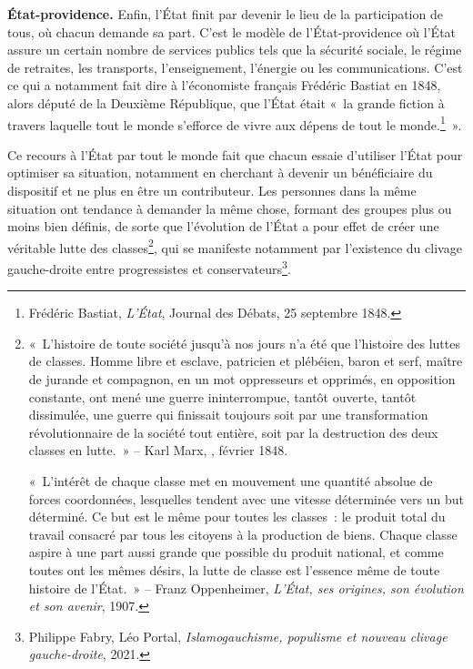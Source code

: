 \textbf{État-providence.} Enfin, l'État finit par devenir le lieu de la participation de tous, où chacun demande sa part. C'est le modèle de l'État-providence où l'État assure un certain nombre de services publics tels que la sécurité sociale, le régime de retraites, les transports, l'enseignement, l'énergie ou les communications. C'est ce qui a notamment fait dire à l'économiste français Frédéric Bastiat en 1848, alors député de la Deuxième République, que l'État était «~la grande fiction à travers laquelle tout le monde s'efforce de vivre aux dépens de tout le monde.\footnote{Frédéric Bastiat, \emph{L'État}, Journal des Débats, 25 septembre 1848.}~». %

Ce recours à l'État par tout le monde fait que chacun essaie d'utiliser l'État pour optimiser sa situation, notamment en cherchant à devenir un bénéficiaire du dispositif et ne plus en être un contributeur. Les personnes dans la même situation ont tendance à demander la même chose, formant des groupes plus ou moins bien définis, de sorte que l'évolution de l'État a pour effet de créer une véritable lutte des classes\footnote{«~L'histoire de toute société jusqu'à nos jours n'a été que l'histoire des luttes de classes. Homme libre et esclave, patricien et plébéien, baron et serf, maître de jurande et compagnon, en un mot oppresseurs et opprimés, en opposition constante, ont mené une guerre ininterrompue, tantôt ouverte, tantôt dissimulée, une guerre qui finissait toujours soit par une transformation révolutionnaire de la société tout entière, soit par la destruction des deux classes en lutte.~» -- Karl Marx, , février 1848.

«~L'intérêt de chaque classe met en mouvement une quantité absolue de forces coordonnées, lesquelles tendent avec une vitesse déterminée vers un but déterminé. Ce but est le même pour toutes les classes~: le produit total du travail consacré par tous les citoyens à la production de biens. Chaque classe aspire à une part aussi grande que possible du produit national, et comme toutes ont les mêmes désirs, la lutte de classe est l'essence même de toute histoire de l'État.~» -- Franz Oppenheimer, \emph{L'État, ses origines, son évolution et son avenir}, 1907.}, qui se manifeste notamment par l'existence du clivage gauche-droite entre progressistes et conservateurs\footnote{Philippe Fabry, Léo Portal, \emph{Islamogauchisme, populisme et nouveau clivage gauche-droite}, 2021.}.

